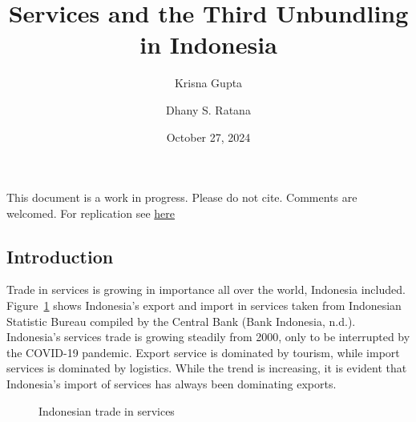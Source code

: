 \documentclass[
  letterpaper,
  DIV=11,
  numbers=noendperiod]{scrartcl}
\title{Services and the Third Unbundling in Indonesia}
\author{Krisna Gupta \and Dhany S. Ratana}
\date{October 27, 2024}
\begin{document}
\maketitle


\begin{tcolorbox}[enhanced jigsaw, colbacktitle=quarto-callout-warning-color!10!white, toprule=.15mm, coltitle=black, colback=white, opacitybacktitle=0.6, opacityback=0, title=\textcolor{quarto-callout-warning-color}{\faExclamationTriangle}\hspace{0.5em}{Warning}, bottomtitle=1mm, toptitle=1mm, colframe=quarto-callout-warning-color-frame, titlerule=0mm, rightrule=.15mm, arc=.35mm, bottomrule=.15mm, breakable, leftrule=.75mm, left=2mm]

This document is a work in progress. Please do not cite. Comments are
welcomed. For replication see
\href{https://github.com/imedkrisna/ERIA_services}{here}

\end{tcolorbox}

\subsection{Introduction}\label{introduction}

Trade in services is growing in importance all over the world, Indonesia
included. Figure~\ref{fig-1} shows Indonesia's export and import in
services taken from Indonesian Statistic Bureau compiled by the Central
Bank (Bank Indonesia, n.d.). Indonesia's services trade is growing
steadily from 2000, only to be interrupted by the COVID-19 pandemic.
Export service is dominated by tourism, while import services is
dominated by logistics. While the trend is increasing, it is evident
that Indonesia's import of services has always been dominating exports.

\begin{figure}


\caption{\label{fig-1}Indonesian trade in services}

\end{figure}%
\end{document}
